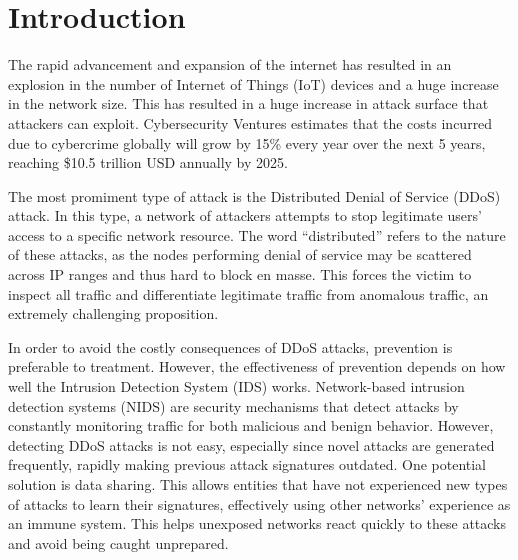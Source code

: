 \section{Introduction}
\label{sec:intro}
\begin{intro}

The rapid advancement and expansion of the internet has resulted in 
an explosion in the number of Internet of Things (IoT) devices and a huge increase in the network size. This has resulted in a huge increase in attack surface that attackers can exploit. Cybersecurity Ventures estimates that the costs incurred due to cybercrime globally will grow by 15\% every year over the next 5 years, reaching \$10.5 trillion USD annually by 2025. 

The most promiment type of attack is the Distributed Denial of Service (DDoS) attack. In this type, a network of attackers attempts to stop legitimate users' access to a specific network resource. The word ``distributed'' refers to the nature of these attacks, as the nodes performing denial of service may be scattered across IP ranges and thus hard to block en masse. This forces the victim to inspect all traffic and differentiate legitimate traffic from anomalous traffic, an extremely challenging proposition.

In order to avoid the costly consequences of DDoS attacks, prevention is preferable to treatment. However, the effectiveness of prevention depends on how well the Intrusion Detection System (IDS) works. Network-based intrusion detection systems (NIDS) are security mechanisms that detect attacks by constantly monitoring traffic for both malicious and benign behavior. However, detecting DDoS attacks is not easy, especially since novel attacks are generated frequently, rapidly making previous attack signatures outdated. One potential solution is data sharing. This allows entities that have not experienced new types of attacks to learn their signatures, effectively using other networks' experience as an immune system. This helps unexposed networks react quickly to these attacks and avoid being caught unprepared.


\end{intro}
